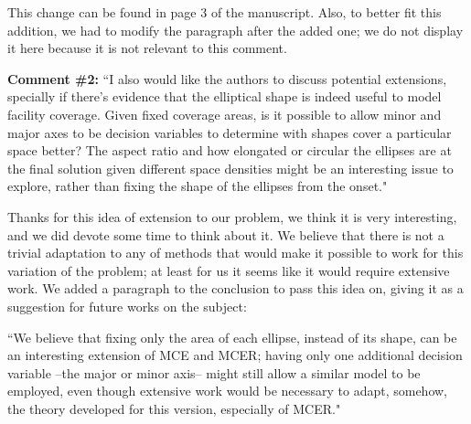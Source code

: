 		This change can be found in page 3 of the manuscript. Also, to better fit this addition, we had to modify the paragraph after the added one; we do not display it here because it is not relevant to this comment.
		
		\textbf{Comment \#2:} ``I also would like the authors to discuss potential extensions, specially if there's evidence that the elliptical shape is indeed useful to model facility coverage. Given fixed coverage areas, is it possible to allow minor and major axes to be decision variables to determine with shapes cover a particular space better? The aspect ratio and how elongated or circular the ellipses are at the final solution given different space densities might be an interesting issue to explore, rather than fixing the shape of the ellipses from the onset."
		
		Thanks for this idea of extension to our problem, we think it is very interesting, and we did devote some time to think about it.
		We believe that there is not a trivial adaptation to any of methods that would make it possible to work for this variation of the problem; at least for us it seems like it would require extensive work. 
		We added a paragraph to the conclusion to pass this idea on, giving it as a suggestion for future works on the subject:
		
		``We believe
		that fixing only the area of each ellipse, instead of its shape, can be an interesting extension of
		MCE and MCER; having only one additional decision variable –the major or minor axis– might
		still allow a similar model to be employed, even though extensive work would be necessary to
		adapt, somehow, the theory developed for this version, especially of MCER."
		
		
